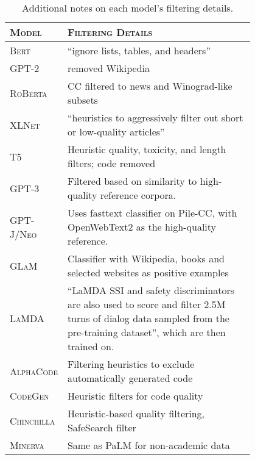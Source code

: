 
\begin{table}[t]
    \centering
    \small
\caption{Additional notes on each model's filtering details.
}
\label{tab:model_survey_filter_list}
\begin{tabular}{l|p{0.8\linewidth}}
\toprule
\textsc{Model} & \textsc{Filtering Details}\\
\midrule
\textsc{Bert} & ``ignore lists, tables, and headers''\\
\textsc{GPT-2} & removed Wikipedia \\
\textsc{RoBerta} & CC filtered to news and Winograd-like subsets\\
\textsc{XLNet} & ``heuristics to aggressively filter out short or low-quality articles''\\
\textsc{T5} & Heuristic quality, toxicity, and length filters; code removed \\
\textsc{GPT-3} & Filtered based on similarity to high-quality reference corpora. \\
\textsc{GPT-J/Neo} & Uses fasttext classifier on Pile-CC, with OpenWebText2 as the high-quality reference. \\
\textsc{GLaM} & Classifier with Wikipedia, books and selected websites as positive examples \\
\textsc{LaMDA} & ``LaMDA SSI and safety discriminators are also used to score and filter 2.5M turns of dialog data sampled from the
pre-training dataset'', which are then trained on.  \\
\textsc{AlphaCode} &  Filtering heuristics to exclude automatically generated code \\
\textsc{CodeGen} & Heuristic filters for code quality \\
\textsc{Chinchilla} & Heuristic-based quality filtering, SafeSearch filter \\
\textsc{Minerva} & Same as PaLM for non-academic data \\

\end{tabular}
\end{table}
